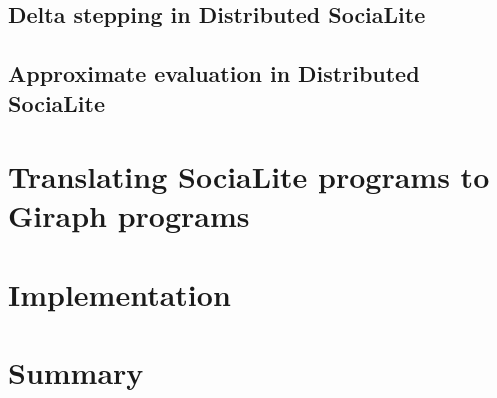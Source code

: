 \documentclass{pracamgr}
\theoremstyle{plain}
\theoremstyle{definition}
\theoremstyle{remark}
\begin{document}
\section{Delta stepping in Distributed SociaLite}\label{s:deltastep}

\section{Approximate evaluation in Distributed SociaLite}\label{s:approxdist}

\chapter{Translating SociaLite programs to Giraph programs}\label{r:s2g}

\chapter{Implementation}\label{r:implementation}

\chapter{Summary}\label{r:summary}
\end{document}
